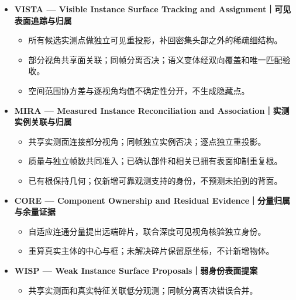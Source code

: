 \documentclass[UTF8,fontset=fandol]{ctexart}
\begin{document}
\begin{itemize}
\begin{itemize}
\begin{itemize}
\begin{itemize}
\item 确认部件补入唯一父体，已拥有表面不能再建重复根；实际执行位于部件融合之后。

\end{itemize}

\item \textbf{VISTA — Visible Instance Surface Tracking and Assignment｜可见表面追踪与归属}


\begin{itemize}
\item 所有候选实测点做独立可见重投影，补回密集头部之外的稀疏细结构。


\item 部分视角共享面关联；同帧分离否决；语义变体经双向覆盖和唯一匹配验收。


\item 空间范围协方差与逐视角均值不确定性分开，不生成隐藏点。

\end{itemize}

\item \textbf{MIRA — Measured Instance Reconciliation and Association｜实测实例关联与归属}


\begin{itemize}
\item 共享实测面连接部分视角；同帧独立实例否决；逐点独立重投影。


\item 质量与独立帧数共同准入；已确认部件和相关已拥有表面抑制重复根。


\item 已有根保持几何；仅新增可靠观测支持的身份，不预测未拍到的背面。

\end{itemize}

\item \textbf{CORE — Component Ownership and Residual Evidence｜分量归属与余量证据}


\begin{itemize}
\item 自适应连通分量提出远端碎片，联合深度可见视角核验独立身份。


\item 重算真实主体的中心与框；未解决碎片保留原坐标，不计新增物体。

\end{itemize}

\item \textbf{WISP — Weak Instance Surface Proposals｜弱身份表面提案}


\begin{itemize}
\item 共享实测面和真实特征关联低分观测；同帧分离否决错误合并。



\end{itemize}
\end{itemize}
\end{itemize}
\end{itemize}
\end{document}
